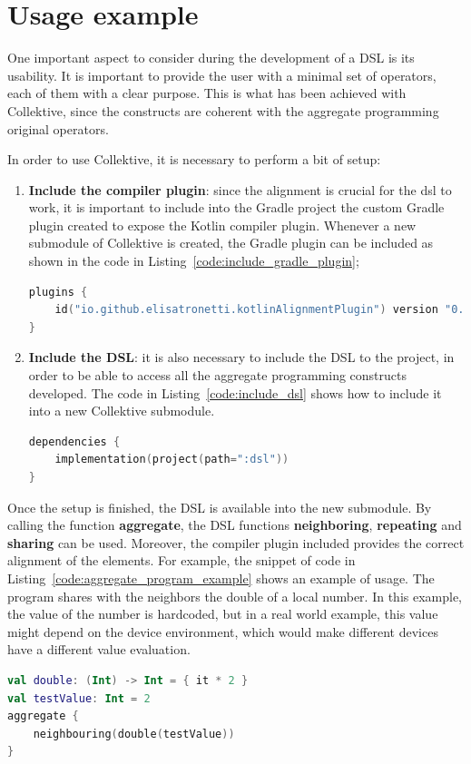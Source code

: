 \section{Usage example}\label{section:usage_example}
One important aspect to consider during the development of a DSL is its usability. It is important to provide the user with a minimal set of operators, each of them with a clear purpose. This is what has been achieved with Collektive, since the constructs are coherent with the aggregate programming original operators.

In order to use Collektive, it is necessary to perform a bit of setup:
\begin{enumerate}
    \item \textbf{Include the compiler plugin}: since the alignment is crucial for the dsl to work, it is important to include into the Gradle project the custom Gradle plugin created to expose the Kotlin compiler plugin. Whenever a new submodule of Collektive is created, the Gradle plugin can be included as shown in the code in Listing~\ref{code:include_gradle_plugin};
\begin{lstlisting}[caption={Inclusion of the custom Gradle plugin to a local Gradle submodule}, captionpos=b, language=Kotlin, label={code:include_gradle_plugin}]
plugins {
    id("io.github.elisatronetti.kotlinAlignmentPlugin") version "0.1.0"
}
\end{lstlisting}
    \item \textbf{Include the DSL}: it is also necessary to include the DSL to the project, in order to be able to access all the aggregate programming constructs developed. The code in Listing~\ref{code:include_dsl} shows how to include it into a new Collektive submodule.
\begin{lstlisting}[caption={Inclusion of the DSL to a local Gradle submodule}, captionpos=b, language=Kotlin, label={code:include_dsl}]
dependencies {
    implementation(project(path=":dsl"))
}
\end{lstlisting}
\end{enumerate}

Once the setup is finished, the DSL is available into the new submodule. By calling the function \textbf{aggregate}, the DSL functions \textbf{neighboring}, \textbf{repeating} and \textbf{sharing} can be used. Moreover, the compiler plugin included provides the correct alignment of the elements.\newline
For example, the snippet of code in Listing~\ref{code:aggregate_program_example} shows an example of usage. The program shares with the neighbors the double of a local number. In this example, the value of the number is hardcoded, but in a real world example, this value might depend on the device environment, which would make different devices have a different value evaluation.
\begin{lstlisting}[caption={Example of an aggregate program developed with Collektive}, captionpos=b, language=Kotlin, label={code:aggregate_program_example}]
val double: (Int) -> Int = { it * 2 }
val testValue: Int = 2
aggregate {
    neighbouring(double(testValue))
}
\end{lstlisting}

